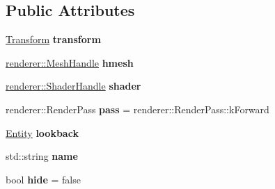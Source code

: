 \subsection*{Public Attributes}
\begin{DoxyCompactItemize}
\item 
\mbox{\label{structnabla_1_1_renderable_system_1_1_renderable_a5f1b87db60c36fad87abee31a26ccbda}} 
\mbox{\hyperlink{structnabla_1_1_transform}{Transform}} {\bfseries transform}
\item 
\mbox{\label{structnabla_1_1_renderable_system_1_1_renderable_af36ec3b0dbb56ee55f13df2b1e6145fc}} 
\mbox{\hyperlink{classnabla_1_1renderer_1_1_handle}{renderer\+::\+Mesh\+Handle}} {\bfseries hmesh}
\item 
\mbox{\label{structnabla_1_1_renderable_system_1_1_renderable_ab019b29ce5b22fa70e9b4c77c31cd49e}} 
\mbox{\hyperlink{classnabla_1_1renderer_1_1_handle}{renderer\+::\+Shader\+Handle}} {\bfseries shader}
\item 
\mbox{\label{structnabla_1_1_renderable_system_1_1_renderable_a994b6d0f346965299cdb13ecfbb67a26}} 
renderer\+::\+Render\+Pass {\bfseries pass} = renderer\+::\+Render\+Pass\+::k\+Forward
\item 
\mbox{\label{structnabla_1_1_renderable_system_1_1_renderable_aabd95c771a9411dd916502290420512c}} 
\mbox{\hyperlink{structnabla_1_1_entity}{Entity}} {\bfseries lookback}
\item 
\mbox{\label{structnabla_1_1_renderable_system_1_1_renderable_a824c0bb04c32a487957dfc244f233868}} 
std\+::string {\bfseries name}
\item 
\mbox{\label{structnabla_1_1_renderable_system_1_1_renderable_a0b483dcd69a97f1a1a6521b2807a02bc}} 
bool {\bfseries hide} = false
\item 
\mbox{\label{structnabla_1_1_renderable_system_1_1_renderable_a68bf9b5ab486928b09e474db3a2ceba3}} 

\end{DoxyCompactItemize}
